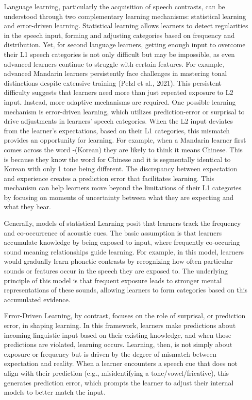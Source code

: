 Language learning, particularly the acquisition of speech contrasts, can be understood through two complementary learning mechanisms: statistical learning and error-driven learning. Statistical learning allows learners to detect regularities in the speech input, forming and adjusting categories based on frequency and distribution. Yet, for second language learners, getting enough input to overcome their L1 speech categories is not only difficult but may be impossible, as even advanced learners continue to struggle with certain features. For example, advanced Mandarin learners persistently face challenges in mastering tonal distinctions despite extensive training (Pelzl et al., 2021). This persistent difficulty suggests that learners need more than just repeated exposure to L2 input. Instead, more adaptive mechanisms are required. One possible learning mechanism is error-driven learning, which utilizes prediction-error or surprisal to drive adjustments in learners' speech categories. When the L2 input deviates from the learner's expectations, based on their L1 categories, this mismatch provides an opportunity for learning. For example, when a Mandarin learner first comes across the word -(Korean) they are likely to think it means Chinese. This is because they know the word for Chinese  and it is segmentally identical to Korean with only 1 tone being different. The discrepancy between expectation and experience creates a prediction error that facilitates learning. This mechanism can help learners move beyond the limitations of their L1 categories by focusing on moments of uncertainty between what they are expecting and what they hear.

Generally, models of statistical Learning posit that learners track the frequency and co-occurrence of acoustic cues. The basic assumption is that learners accumulate knowledge by being exposed to input, where frequently co-occuring sound meaning relationships guide learning. For example, in this model, learners would gradually learn phonetic contrasts by recognizing how often particular sounds or features occur in the speech they are exposed to. The underlying principle of this model is that frequent exposure leads to stronger mental representations of these sounds, allowing learners to form categories based on this accumulated evidence. 

Error-Driven Learning, by contrast, focuses on the role of surprisal, or prediction error, in shaping learning. In this framework, learners make predictions about incoming linguistic input based on their existing knowledge, and when those predictions are violated, learning occurs. Learning, then, is not simply about exposure or frequency but is driven by the degree of mismatch between expectation and reality. When a learner encounters a speech cue that does not align with their prediction (e.g., misidentifying a tone/vowel/fricative), this generates prediction error, which prompts the learner to adjust their internal models to better match the input. 


